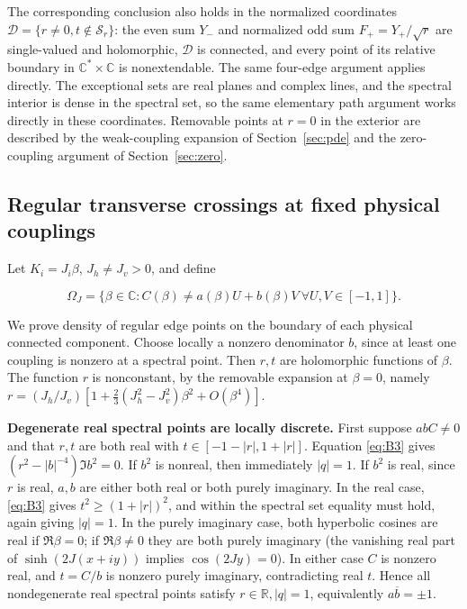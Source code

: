 \documentclass[11pt,a4paper]{article}
\numberwithin{equation}{section}
\theoremstyle{plain}
\theoremstyle{definition}
\begin{document}
The corresponding conclusion also holds in the normalized coordinates \(\mathcal D=\{r\ne0,t\notin\mathcal S_r\}\): the even sum \(Y_-\) and normalized odd sum \(F_+=Y_+/\sqrt r\) are single-valued and holomorphic, \(\mathcal D\) is connected, and every point of its relative boundary in \(\mathbb C^*\times\mathbb C\) is nonextendable. The same four-edge argument applies directly. The exceptional sets are real planes and complex lines, and the spectral interior is dense in the spectral set, so the same elementary path argument works directly in these coordinates. Removable points at \(r=0\) in the exterior are described by the weak-coupling expansion of Section~\ref{sec:pde} and the zero-coupling argument of Section~\ref{sec:zero}.

\subsection{Regular transverse crossings at fixed physical couplings}\label{sec:slicedensity}

Let \(K_i=J_i\beta\), \(J_h\ne J_v>0\), and define

\begin{equation}
\Omega_J=\{\beta\in\mathbb C:C(\beta)\ne a(\beta)U+b(\beta)V\ \forall U,V\in[-1,1]\}.
\label{eq:B5}
\end{equation}

We prove density of regular edge points on the boundary of each physical connected component. Choose locally a nonzero denominator \(b\), since at least one coupling is nonzero at a spectral point. Then \(r,t\) are holomorphic functions of \(\beta\). The function \(r\) is nonconstant, by the removable expansion at \(\beta=0\), namely \(r=(J_h/J_v)[1+\tfrac23(J_h^2-J_v^2)\beta^2+O(\beta^4)]\).

\textbf{Degenerate real spectral points are locally discrete.} First suppose \(abC\ne0\) and that \(r,t\) are both real with \(t\in[-1-|r|,1+|r|]\). Equation \eqref{eq:B3} gives \((r^2-|b|^{-4})\Im b^2=0\). If \(b^2\) is nonreal, then immediately \(|q|=1\). If \(b^2\) is real, since \(r\) is real, \(a,b\) are either both real or both purely imaginary. In the real case, \eqref{eq:B3} gives \(t^2\ge(1+|r|)^2\), and within the spectral set equality must hold, again giving \(|q|=1\). In the purely imaginary case, both hyperbolic cosines are real if \(\Re\beta=0\); if \(\Re\beta\ne0\) they are both purely imaginary (the vanishing real part of \(\sinh(2J(x+iy))\) implies \(\cos(2Jy)=0\)). In either case \(C\) is nonzero real, and \(t=C/b\) is nonzero purely imaginary, contradicting real \(t\). Hence all nondegenerate real spectral points satisfy \(r\in\mathbb R,|q|=1\), equivalently \(a\overline b=\pm1\).
\end{document}
